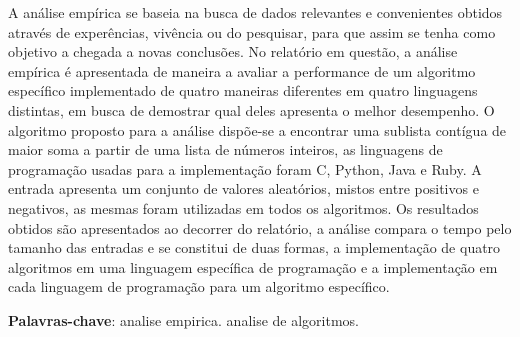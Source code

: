 \documentclass[
	12pt,				%
	oneside,   	        %
	a4paper,			%
	english,			%
	french,				%
	spanish,			%
	brazil,				%
	]{pacotes/abntex2}
\begin{document}
\frenchspacing 



\imprimirfolhaderosto



\begin{resumo}
A análise empírica se baseia na busca de dados relevantes e convenientes obtidos através de experências, vivência ou do pesquisar, para que assim se tenha como objetivo a chegada a novas conclusões. No relatório em questão, a análise empírica é apresentada de maneira a avaliar a performance de um algoritmo específico implementado de quatro maneiras diferentes em quatro linguagens distintas, em busca de demostrar qual deles apresenta o melhor desempenho. O algoritmo proposto para a análise dispõe-se a encontrar uma sublista contígua de maior soma a partir de uma lista de números inteiros, as linguagens de programação usadas para a implementação foram C, Python, Java e Ruby. A entrada apresenta um conjunto de valores aleatórios, mistos entre positivos e negativos, as mesmas foram utilizadas em todos os algoritmos. Os resultados obtidos são apresentados ao decorrer do relatório, a análise compara o tempo pelo tamanho das entradas e se constitui de duas formas, a implementação de quatro algoritmos em uma linguagem específica de programação e a implementação em cada linguagem de programação para um algoritmo específico.

 \vspace{\onelineskip}
    
 \noindent
 \textbf{Palavras-chave}: analise empirica. analise de algoritmos.  
\end{resumo}



\end{document}
